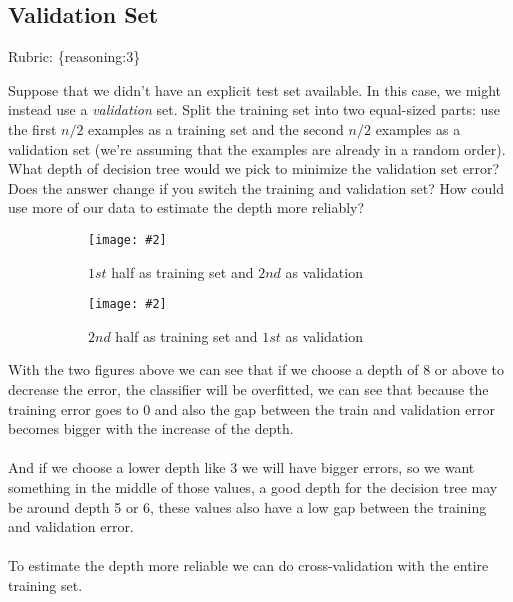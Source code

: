 \documentclass{article}
\def\rubric#1{\gre{Rubric: \{#1\}}}{}
\def\blu#1{{\color{blu}#1}}
\def\gre#1{{\color{gre}#1}}
\def\ans#1{{\color{ans}#1}}
\newcommand{\centerfig}[2]{\begin{center}\texttt{[image: \#2]}\end{center}}
\begin{document}
\subsection{Validation Set}
\rubric{reasoning:3}

Suppose that we didn't have an explicit test set available. In this case, we might instead use a \emph{validation} set. Split the training set into two equal-sized parts: use the first $n/2$ examples as a training set and the second $n/2$ examples as a validation set (we're assuming that the examples are already in a random order). \blu{What depth of decision tree would we pick to minimize the validation set error? Does the answer change if you switch the training and validation set? How could use more of our data to  estimate the depth more reliably?} \\
\clearpage
\begin{figure}[htp]
   \begin{subfigure}[b]{0.5\textwidth} \color{ans}
       \centerfig{1}{../figs/q1_2_training_validation_1}
       {
         \begin{center}
            $1st$ half as training set and $2nd$ as validation
         \end{center}
       }
     \label{fig:1}
   \end{subfigure}
   \begin{subfigure}[b]{0.5\textwidth} \color{ans}
       \centerfig{1}{../figs/q1_2_training_validation_2}
      {
          \begin{center}
            $2nd$ half as training set and $1st$ as validation
          \end{center}
      }
     \label{fig:2}
   \end{subfigure}
\end{figure}
\ans{
   With the two figures above we can see that if we choose a depth of 8 or above to decrease the error, 
   the classifier will be overfitted, we can see that because the training error goes to 0 and also the 
   gap between the train and validation error becomes bigger with the increase of the depth. \\ \\
   And if we choose a lower depth like 3 we will have bigger errors, so we want something in the middle 
   of those values, a good depth for the decision tree may be around depth 5 or 6, these values also 
   have a low gap between the training and validation error. \\ \\
   To estimate the depth more reliable we can do cross-validation with the entire training set.
}
\end{document}
